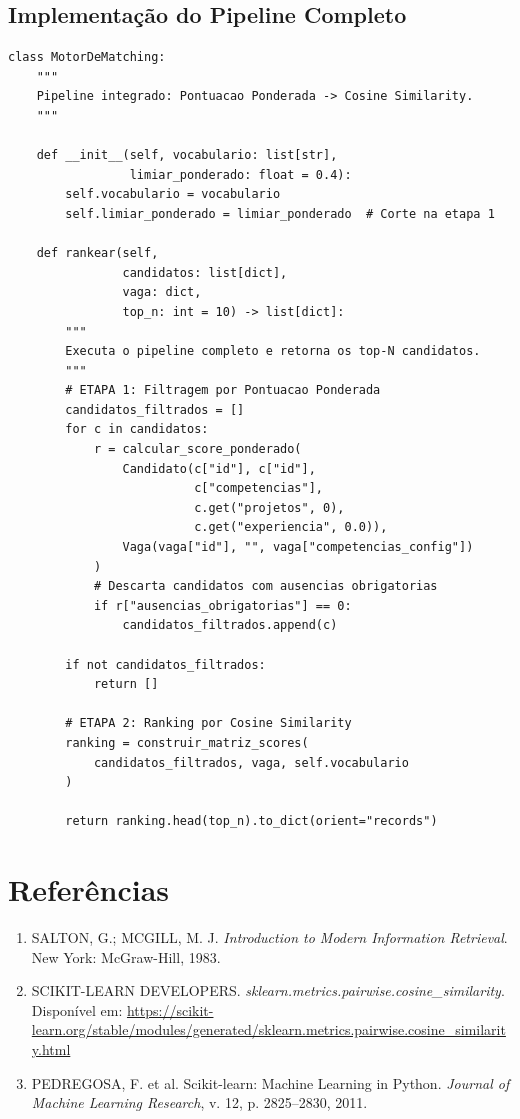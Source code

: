 \documentclass[12pt,a4paper]{article}
\begin{document}
\subsection{Implementação do Pipeline Completo}

\begin{lstlisting}[caption={Pipeline completo de matching},
                   label={lst:pipeline}]
class MotorDeMatching:
    """
    Pipeline integrado: Pontuacao Ponderada -> Cosine Similarity.
    """

    def __init__(self, vocabulario: list[str],
                 limiar_ponderado: float = 0.4):
        self.vocabulario = vocabulario
        self.limiar_ponderado = limiar_ponderado  # Corte na etapa 1

    def rankear(self,
                candidatos: list[dict],
                vaga: dict,
                top_n: int = 10) -> list[dict]:
        """
        Executa o pipeline completo e retorna os top-N candidatos.
        """
        # ETAPA 1: Filtragem por Pontuacao Ponderada
        candidatos_filtrados = []
        for c in candidatos:
            r = calcular_score_ponderado(
                Candidato(c["id"], c["id"],
                          c["competencias"],
                          c.get("projetos", 0),
                          c.get("experiencia", 0.0)),
                Vaga(vaga["id"], "", vaga["competencias_config"])
            )
            # Descarta candidatos com ausencias obrigatorias
            if r["ausencias_obrigatorias"] == 0:
                candidatos_filtrados.append(c)

        if not candidatos_filtrados:
            return []

        # ETAPA 2: Ranking por Cosine Similarity
        ranking = construir_matriz_scores(
            candidatos_filtrados, vaga, self.vocabulario
        )

        return ranking.head(top_n).to_dict(orient="records")

\end{lstlisting}



\section*{Referências}

\begin{enumerate}
  \item SALTON, G.; MCGILL, M. J. \textit{Introduction to Modern Information Retrieval}.
        New York: McGraw-Hill, 1983.
  \item SCIKIT-LEARN DEVELOPERS. \textit{sklearn.metrics.pairwise.cosine\_similarity}.
        Disponível em: \url{https://scikit-learn.org/stable/modules/generated/sklearn.metrics.pairwise.cosine_similarity.html}
  \item PEDREGOSA, F. et al. Scikit-learn: Machine Learning in Python.
        \textit{Journal of Machine Learning Research}, v. 12, p. 2825–2830, 2011.
\end{enumerate}
\end{document}
